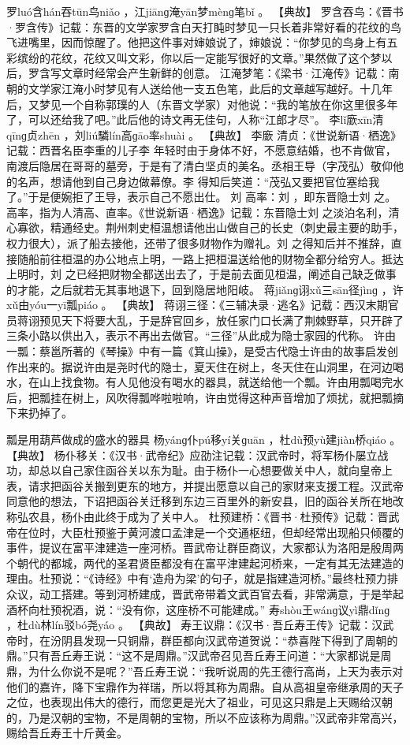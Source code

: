 \documentclass[12pt,UTF8]{ctexbook}
\begin{document}
罗luó含hán吞tūn鸟niǎo
，江jiānɡ淹yān梦mènɡ笔bǐ
。
【典故】
罗含吞鸟：《晋书·罗含传》记载：东晋的文学家罗含白天打盹时梦见一只长着非常好看的花纹的鸟飞进嘴里，因而惊醒了。他把这件事对婶娘说了，婶娘说：“你梦见的鸟身上有五彩缤纷的花纹，花纹又叫文彩，你以后一定能写很好的文章。”果然做了这个梦以后，罗含写文章时经常会产生新鲜的创意。
江淹梦笔：《梁书·江淹传》记载：南朝的文学家江淹小时梦见有人送给他一支五色笔，此后的文章越写越好。十几年后，又梦见一个自称郭璞的人（东晋文学家）对他说：“我的笔放在你这里很多年了，可以还给我了吧。”此后他的诗文再无佳句，人称“江郎才尽”。
李lǐ廞xīn清qīnɡ贞zhēn
，刘liú驎lín高ɡāo率shuài
。
【典故】
李廞
清贞：《世说新语·栖逸》记载：西晋名臣李重的儿子李 年轻时由于身体不好，不愿意结婚，也不肯做官，南渡后隐居在哥哥的墓旁，于是有了清白坚贞的美名。丞相王导（字茂弘）敬仰他的名声，想请他到自己身边做幕僚。李
得知后笑道：“茂弘又要把官位塞给我了。”于是便婉拒了王导，表示自己不愿出仕。
刘
高率：刘
，即东晋隐士刘
之。高率，指为人清高、直率。《世说新语·栖逸》记载：东晋隐士刘
之淡泊名利，清心寡欲，精通经史。荆州刺史桓温想请他出山做自己的长史（刺史最主要的助手，权力很大），派了船去接他，还带了很多财物作为赠礼。刘
之得知后并不推辞，直接随船前往桓温的办公地点上明，一路上把桓温送给他的财物全都分给穷人。抵达上明时，刘 之已经把财物全都送出去了，于是前去面见桓温，阐述自己缺乏做事的才能，之后就若无其事地退下，回到隐居地阳岐。
蒋jiǎnɡ诩xǔ三sān径jìnɡ
，许xǔ由yóu一yī瓢piáo
。
【典故】
蒋诩三径：《三辅决录·逃名》记载：西汉末期官员蒋诩预见天下将要大乱，于是辞官回乡，放任家门口长满了荆棘野草，只开辟了三条小路以供出入，表示不再出去做官。“三径”从此成为隐士家园的代称。
许由一瓢：蔡邕所著的《琴操》中有一篇《箕山操》，是受古代隐士许由的故事启发创作出来的。据说许由是尧时代的隐士，夏天住在树上，冬天住在山洞里，在河边喝水，在山上找食物。有人见他没有喝水的器具，就送给他一个瓢。许由用瓢喝完水后，把瓢挂在树上，风吹得瓢哗啦啦响，许由觉得这种声音增加了烦扰，就把瓢摘下来扔掉了。

瓢是用葫芦做成的盛水的器具
杨yánɡ仆pú移yí关ɡuān
，杜dù预yù建jiàn桥qiáo
。
【典故】
杨仆移关：《汉书·武帝纪》应劭注记载：汉武帝时，将军杨仆屡立战功，却总以自己家住函谷关以东为耻。由于杨仆一心想要做关中人，就向皇帝上表，请求把函谷关搬到更东的地方，并提出愿意以自己的家财来支援工程。汉武帝同意他的想法，下诏把函谷关迁移到东边三百里外的新安县，旧的函谷关所在地改称弘农县，杨仆由此终于成为了关中人。
杜预建桥：《晋书·杜预传》记载：晋武帝在位时，大臣杜预鉴于黄河渡口孟津是一个交通枢纽，但却经常出现船只倾覆的事件，提议在富平津建造一座河桥。晋武帝让群臣商议，大家都认为洛阳是殷周两个朝代的都城，两代的圣君贤臣都没有在富平津建起河桥来，一定有其无法建造的理由。杜预说：“《诗经》中有‘造舟为梁’的句子，就是指建造河桥。”最终杜预力排众议，动工搭建。等到河桥建成，晋武帝带着文武百官去看，非常满意，于是举起酒杯向杜预祝酒，说：“没有你，这座桥不可能建成。”
寿shòu王wánɡ议yì鼎dǐnɡ
，杜dù林lín驳bó尧yáo
。
【典故】
寿王议鼎：《汉书·吾丘寿王传》记载：汉武帝时，在汾阴县发现一只铜鼎，群臣都向汉武帝道贺说：“恭喜陛下得到了周朝的鼎。”只有吾丘寿王说：“这不是周鼎。”汉武帝召见吾丘寿王问道：“大家都说是周鼎，为什么你说不是呢？”吾丘寿王说：“我听说周的先王德行高尚，上天为表示对他们的嘉许，降下宝鼎作为祥瑞，所以将其称为周鼎。自从高祖皇帝继承周的天子之位，也表现出伟大的德行，而您更是光大了祖业，可见这只鼎是上天赐给汉朝的，乃是汉朝的宝物，不是周朝的宝物，所以不应该称为周鼎。”汉武帝非常高兴，赐给吾丘寿王十斤黄金。
\end{document}
